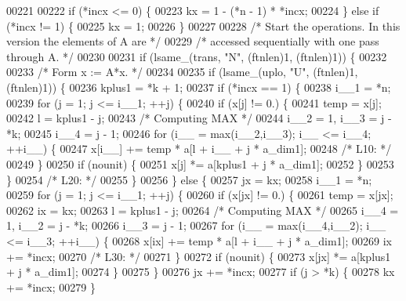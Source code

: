 \begin{DoxyCode}
00221 
00222     \textcolor{keywordflow}{if} (*incx <= 0) \{
00223     kx = 1 - (*n - 1) * *incx;
00224     \} \textcolor{keywordflow}{else} \textcolor{keywordflow}{if} (*incx != 1) \{
00225     kx = 1;
00226     \}
00227 
00228 \textcolor{comment}{/*     Start the operations. In this version the elements of A are */}
00229 \textcolor{comment}{/*     accessed sequentially with one pass through A. */}
00230 
00231     \textcolor{keywordflow}{if} (lsame\_(trans, \textcolor{stringliteral}{"N"}, (ftnlen)1, (ftnlen)1)) \{
00232 
00233 \textcolor{comment}{/*         Form  x := A*x. */}
00234 
00235     \textcolor{keywordflow}{if} (lsame\_(uplo, \textcolor{stringliteral}{"U"}, (ftnlen)1, (ftnlen)1)) \{
00236         kplus1 = *k + 1;
00237         \textcolor{keywordflow}{if} (*incx == 1) \{
00238         i\_\_1 = *n;
00239         \textcolor{keywordflow}{for} (j = 1; j <= i\_\_1; ++j) \{
00240             \textcolor{keywordflow}{if} (x[j] != 0.) \{
00241             temp = x[j];
00242             l = kplus1 - j;
00243 \textcolor{comment}{/* Computing MAX */}
00244             i\_\_2 = 1, i\_\_3 = j - *k;
00245             i\_\_4 = j - 1;
00246             \textcolor{keywordflow}{for} (i\_\_ = max(i\_\_2,i\_\_3); i\_\_ <= i\_\_4; ++i\_\_) \{
00247                 x[i\_\_] += temp * a[l + i\_\_ + j * a\_dim1];
00248 \textcolor{comment}{/* L10: */}
00249             \}
00250             \textcolor{keywordflow}{if} (nounit) \{
00251                 x[j] *= a[kplus1 + j * a\_dim1];
00252             \}
00253             \}
00254 \textcolor{comment}{/* L20: */}
00255         \}
00256         \} \textcolor{keywordflow}{else} \{
00257         jx = kx;
00258         i\_\_1 = *n;
00259         \textcolor{keywordflow}{for} (j = 1; j <= i\_\_1; ++j) \{
00260             \textcolor{keywordflow}{if} (x[jx] != 0.) \{
00261             temp = x[jx];
00262             ix = kx;
00263             l = kplus1 - j;
00264 \textcolor{comment}{/* Computing MAX */}
00265             i\_\_4 = 1, i\_\_2 = j - *k;
00266             i\_\_3 = j - 1;
00267             \textcolor{keywordflow}{for} (i\_\_ = max(i\_\_4,i\_\_2); i\_\_ <= i\_\_3; ++i\_\_) \{
00268                 x[ix] += temp * a[l + i\_\_ + j * a\_dim1];
00269                 ix += *incx;
00270 \textcolor{comment}{/* L30: */}
00271             \}
00272             \textcolor{keywordflow}{if} (nounit) \{
00273                 x[jx] *= a[kplus1 + j * a\_dim1];
00274             \}
00275             \}
00276             jx += *incx;
00277             \textcolor{keywordflow}{if} (j > *k) \{
00278             kx += *incx;
00279             \}

\end{DoxyCode}
